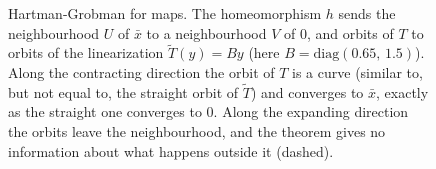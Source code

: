 \begin{figure}[ht]
    \caption{Hartman-Grobman for maps. The homeomorphism $h$ sends the neighbourhood $U$ of $\bar{x}$
    to a neighbourhood $V$ of $0$, and orbits of $T$ to orbits of the linearization $\tilde{T}(y)=By$
    (here $B=\mathrm{diag}(0.65,\,1.5)$). Along the contracting direction the orbit of $T$ is a curve
    (similar to, but not equal to, the straight orbit of $\tilde{T}$) and converges to $\bar{x}$,
    exactly as the straight one converges to $0$. Along the expanding direction the orbits leave the
    neighbourhood, and the theorem gives no information about what happens outside it (dashed).}
    \label{fig:hartman_grobman_maps}
\end{figure}